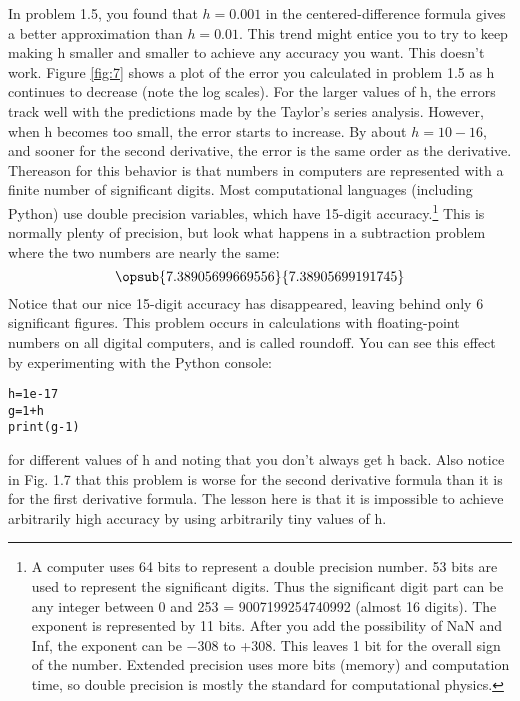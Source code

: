 In problem 1.5, you found that $h = 0.001$ in the centered-difference formula gives a better approximation than $h=0.01$. This trend might entice you to try to keep making h smaller and smaller to achieve any accuracy you want. This doesn\rq t work. Figure \ref{fig:7} shows a plot of the error you calculated in problem 1.5 as h continues to decrease (note the log scales). For the larger values of h, the errors track well with the predictions made by the Taylor\rq s series analysis. However, when h becomes too small, the error starts to increase. By about $h=10−16$, and sooner for the second derivative, the error is the same order as the derivative. Thereason for this behavior is that numbers in computers are represented with a finite number of significant digits. Most computational languages (including Python) use double precision variables, which have 15-digit accuracy.\footnote{A computer uses 64 bits to represent a double precision number. 53 bits are used to represent the significant digits. Thus the significant digit part can be any integer between 0 and 253 = 9007199254740992 (almost 16 digits). The exponent is represented by 11 bits. After you add the possibility of NaN and Inf, the exponent can be −308 to +308. This leaves 1 bit for the overall sign of the number. Extended precision uses more bits (memory) and computation time, so double precision is mostly the standard for computational physics.} This is normally plenty of precision, but look what happens in a subtraction problem where the two numbers are nearly the same:
\begin{equation} \label{eq:12}
\opsub{7.38905699669556}{7.38905699191745}
\end{equation}
Notice that our nice 15-digit accuracy has disappeared, leaving behind only 6 significant figures. This problem occurs in calculations with floating-point numbers on all digital computers, and is called roundoff. You can see this effect by experimenting with the Python console:
\begin{lstlisting}
h=1e-17
g=1+h
print(g-1)
\end{lstlisting}
for different values of h and noting that you don\rq t always get h back. Also notice in Fig. 1.7 that this problem is worse for the second derivative formula than it is for the first derivative formula. The lesson here is that it is impossible to achieve arbitrarily high accuracy by using arbitrarily tiny values of h.
